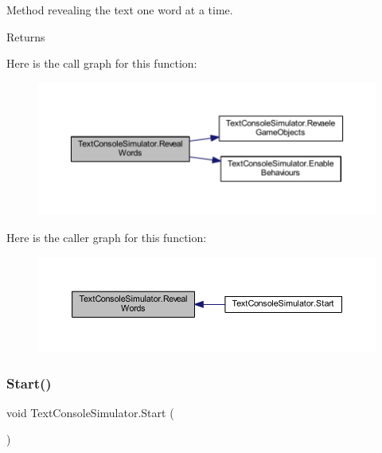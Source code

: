 Method revealing the text one word at a time. 

\begin{DoxyReturn}{Returns}

\end{DoxyReturn}
Here is the call graph for this function\+:
\nopagebreak
\begin{figure}[H]
\begin{center}
\leavevmode
\includegraphics[width=350pt]{class_text_console_simulator_a02b5d223477f40d452dc46d86f55376f_cgraph}
\end{center}
\end{figure}
Here is the caller graph for this function\+:
\nopagebreak
\begin{figure}[H]
\begin{center}
\leavevmode
\includegraphics[width=350pt]{class_text_console_simulator_a02b5d223477f40d452dc46d86f55376f_icgraph}
\end{center}
\end{figure}
\mbox{\label{class_text_console_simulator_a9e43e79bb6b5c9b3ecfa426ded2a7995}} 
\subsubsection{\texorpdfstring{Start()}{Start()}}
{\footnotesize\ttfamily void Text\+Console\+Simulator.\+Start (\begin{DoxyParamCaption}{ }\end{DoxyParamCaption})\hspace{0.3cm}{\ttfamily [private]}}

